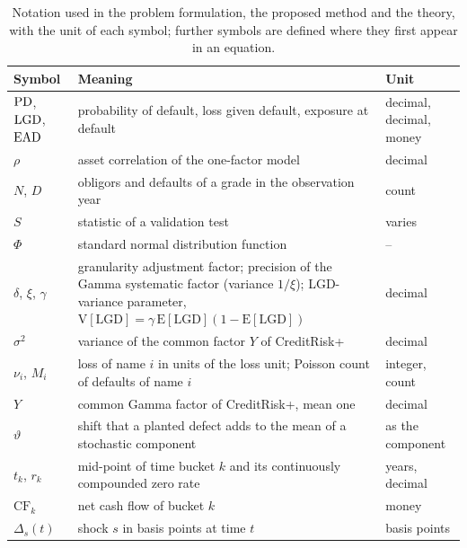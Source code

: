 \begin{table}[htbp]
\centering
\small
\caption{Notation used in the problem formulation, the proposed method and the theory, with the unit of each symbol; further symbols are defined where they first appear in an equation.}
\label{tab:notation}
\begin{tabular}{lp{8.2cm}l}
\toprule
Symbol & Meaning & Unit \\
\midrule
$\mathrm{PD}$, $\mathrm{LGD}$, $\mathrm{EAD}$ & probability of default, loss given default, exposure at default & decimal, decimal, money \\
$\rho$ & asset correlation of the one-factor model & decimal \\
$N$, $D$ & obligors and defaults of a grade in the observation year & count \\
$S$ & statistic of a validation test & varies \\
$\Phi$ & standard normal distribution function & -- \\
$\delta$, $\xi$, $\gamma$ & \relax granularity adjustment factor; precision of the Gamma systematic factor (variance $1/\xi$); LGD-variance parameter, $\mathrm{V}[\mathrm{LGD}]=\gamma\,\mathrm{E}[\mathrm{LGD}](1-\mathrm{E}[\mathrm{LGD}])$ & decimal \\
$\sigma^2$ & \relax variance of the common factor $Y$ of CreditRisk+ & decimal \\
$\nu_i$, $M_i$ & \relax loss of name $i$ in units of the loss unit; Poisson count of defaults of name $i$ & integer, count \\
$Y$ & common Gamma factor of CreditRisk+, mean one & decimal \\
$\vartheta$ & shift that a planted defect adds to the mean of a stochastic component & as the component \\
$t_k$, $r_k$ & \relax mid-point of time bucket $k$ and its continuously compounded zero rate & years, decimal \\
$\mathrm{CF}_k$ & \relax net cash flow of bucket $k$ & money \\
$\Delta_s(t)$ & \relax shock $s$ in basis points at time $t$ & basis points \\
\bottomrule
\end{tabular}
\end{table}
